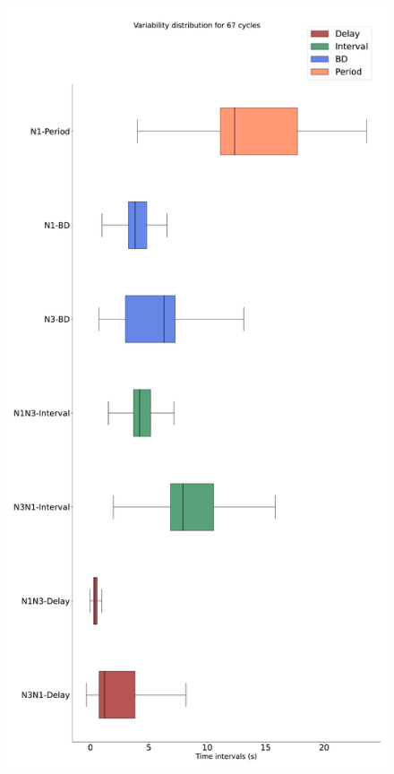 \begin{figure}[htbp]
\begin{minipage}{0.9\textwidth}
\begin{minipage}[b]{0.45\textwidth}
			\includegraphics[width=\textwidth]{./invariants/data/SUSSEX/prep3/images/prep3_boxplot.pdf}
		\end{minipage}
		\begin{minipage}[b]{0.53\textwidth}
			\centering

\end{minipage}
\end{minipage}
\end{figure}
